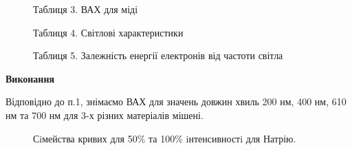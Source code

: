 \documentclass[a4paper,14pt]{extreport}
\begin{document}
\begin{figure}[h]
\caption{Таблиця 3. ВАХ для міді}
\end{figure}

\begin{figure}[h]
\caption{Таблиця 4. Світлові характеристики}
\end{figure}

\begin{figure}[h]
\caption{Таблиця 5. Залежність енергії електронів від частоти світла}
\end{figure}





\clearpage
\newpage
\begin{center}\textbf{Виконання}\end{center}\par
Відповідно до п.1, знімаємо ВАХ для значень довжин хвиль 200 нм, 400 нм, 
610 нм та  700 нм для 3-х різних матеріалів мішені.
\begin{center}\end{center}
\begin{figure}[h]
\caption{Сiмейства кривих для 50\% та 100\% iнтенсивностi для Натрію.}
\label{ris1}
\end{figure}
\end{document}
